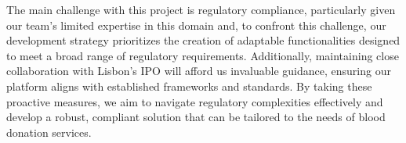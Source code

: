 The main challenge with this project is regulatory compliance, particularly given our team's limited expertise in this domain and, to confront this challenge, our development strategy prioritizes the creation of adaptable functionalities designed to meet a broad range of regulatory requirements. Additionally, maintaining close collaboration with Lisbon's IPO will afford us invaluable guidance, ensuring our platform aligns with established frameworks and standards. By taking these proactive measures, we aim to navigate regulatory complexities effectively and develop a robust, compliant solution that can be tailored to the needs of blood donation services.
%
%
%
%
%
%
%
%
%
%
%
